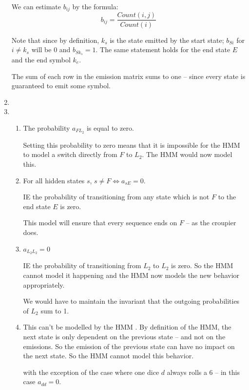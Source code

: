 \documentclass[10pt, a4paper]{article}
\begin{document}
\begin{enumerate}[label=(\alph*)]
We can estimate $b_{ij}$ by the formula:
\[
b_{ij} = \frac{\mathit{Count}(i, j)}{\mathit{Count}(i)}
\]

Note that since by definition, $k_s$ is the state emitted by the start state; $b_{Si}$ for $i \neq k_s$ will be 
0 and $b_{Sk_s} = 1$. The same statement holds for the end state $E$ and the end symbol $k_e$.

The sum of each row in the emission matrix sums to one -- since every state is guaranteed to emit some symbol.

\item 



\item 

\begin{enumerate}[label=(\alph*)]

\item The probability $a_{FL_2}$ is equal to zero.

Setting this probability to zero means that it is impossible for the HMM to model a switch directly from 
$F$ to $L_2$. The HMM would now model this.

\item For all hidden states $s$, $s \neq F \Longleftrightarrow a_{sE} = 0$.

IE the probability of transitioning from any state which is not $F$ to the end state $E$ is zero.

This model will ensure that every sequence ends on $F$ -- as the croupier does.

\item $a_{L_2L_2} = 0$

IE the probability of transitioning from $L_2$ to $L_2$ is zero. So the HMM cannot model it happening 
and the HMM now models the new behavior appropriately.

We would have to maintain the invariant that the outgoing probabilities of $L_2$ sum to 1.

\item This can't be modelled by the HMM \dag. By definition of the HMM, the next state is only dependent on the 
previous state -- and not on the emissions. So the emission of the previous state can have no impact on the 
next state. So the HMM cannot model this behavior.

\dag with the exception of the case where one dice $d$ always rolls a 6 -- in this case $a_{dd} = 0$.

\end{enumerate}

\end{enumerate}
\end{document}
